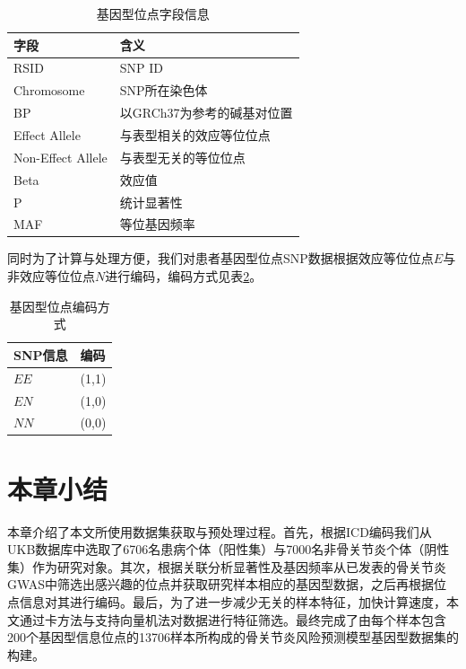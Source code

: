\begin{table}[!h]
	\renewcommand{\arraystretch}{1.2}
	\centering\wuhao
	\caption{基因型位点字段信息} \label{SNP_traits} \vspace{2mm}
	\begin{tabularx}{\textwidth} { 
   >{\centering\arraybackslash}X 
   >{\centering\arraybackslash}X }
	\toprule[1.5pt]
		字段 & 含义                \\
	\midrule[1pt]
		RSID              & SNP ID            \\
    Chromosome        & SNP所在染色体          \\
    BP                & 以GRCh37为参考的碱基对位置  \\
    Effect Allele     & 与表型相关的效应等位位点        \\
    Non-Effect Allele & 与表型无关的等位位点        \\
    Beta              & 效应值               \\
    P                 & 统计显著性             \\
    MAF               & 等位基因频率           \\
	\bottomrule[1.5pt]
	\end{tabularx}
\end{table}

同时为了计算与处理方便，我们对患者基因型位点SNP数据根据效应等位位点$E$与非效应等位位点$N$进行编码，编码方式见表\ref{SNP_encoding}。

\begin{table}[!h]
	\renewcommand{\arraystretch}{1.2}
	\centering\wuhao
	\caption{基因型位点编码方式} \label{SNP_encoding} \vspace{2mm}
	\begin{tabularx}{\textwidth} { 
   >{\centering\arraybackslash}X 
   >{\centering\arraybackslash}X }
	\toprule[1.5pt]
		SNP信息 & 编码\\
	\midrule[1pt]
	    $EE$ & (1,1) \\
	    $EN$ & (1,0) \\
	    $NN$ & (0,0) \\
	\bottomrule[1.5pt]
	\end{tabularx}
\end{table}

\section{本章小结}
本章介绍了本文所使用数据集获取与预处理过程。首先，根据ICD编码我们从UKB数据库中选取了6706名患病个体（阳性集）与7000名非骨关节炎个体（阴性集）作为研究对象。其次，根据关联分析显著性及基因频率从已发表的骨关节炎GWAS中筛选出感兴趣的位点并获取研究样本相应的基因型数据，之后再根据位点信息对其进行编码。最后，为了进一步减少无关的样本特征，加快计算速度，本文通过卡方法与支持向量机法对数据进行特征筛选。最终完成了由每个样本包含200个基因型信息位点的13706样本所构成的骨关节炎风险预测模型基因型数据集的构建。